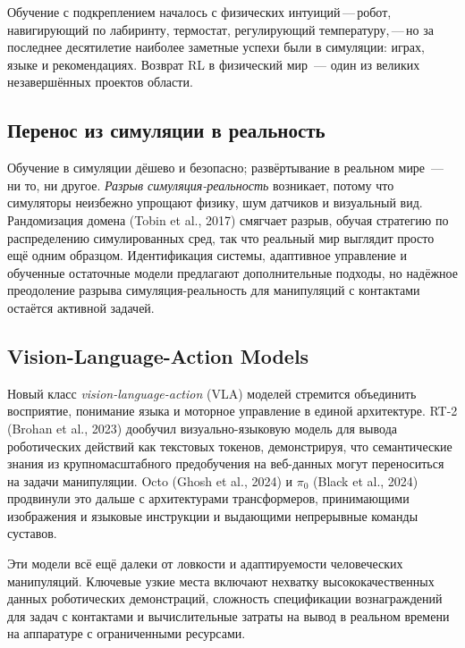 Обучение с подкреплением началось с физических интуиций\,---\,робот,
навигирующий по лабиринту, термостат, регулирующий температуру,\,---\,но за
последнее десятилетие наиболее заметные успехи были в симуляции:
играх, языке и рекомендациях. Возврат RL в физический
мир~--- один из великих незавершённых проектов области.

\subsection{Перенос из симуляции в реальность}

Обучение в симуляции дёшево и безопасно; развёртывание в реальном мире~---
ни то, ни другое. \emph{Разрыв симуляция-реальность}
возникает, потому что симуляторы неизбежно упрощают физику, шум датчиков
и визуальный вид. Рандомизация домена (Tobin et al., 2017)
смягчает разрыв, обучая стратегию по распределению симулированных сред, так
что реальный мир выглядит просто ещё одним образцом. Идентификация системы,
адаптивное управление и обученные остаточные модели предлагают дополнительные подходы,
но надёжное преодоление разрыва симуляция-реальность для
манипуляций с контактами остаётся активной задачей.

\subsection{Vision-Language-Action Models}

Новый класс \emph{vision-language-action} (VLA) моделей стремится
объединить восприятие, понимание языка и моторное управление в единой
архитектуре. RT-2 (Brohan et al., 2023) дообучил
визуально-языковую модель для вывода роботических действий как текстовых токенов,
демонстрируя, что семантические знания из крупномасштабного предобучения на
веб-данных могут переноситься на задачи манипуляции. Octo (Ghosh et al., 2024) и
$\pi_0$ (Black et al., 2024) продвинули это дальше с
архитектурами трансформеров, принимающими изображения и языковые инструкции
и выдающими непрерывные команды суставов.

Эти модели всё ещё далеки от ловкости и адаптируемости
человеческих манипуляций. Ключевые узкие места включают нехватку
высококачественных данных роботических демонстраций, сложность спецификации
вознаграждений для задач с контактами и вычислительные затраты
на вывод в реальном времени на аппаратуре с ограниченными ресурсами.


